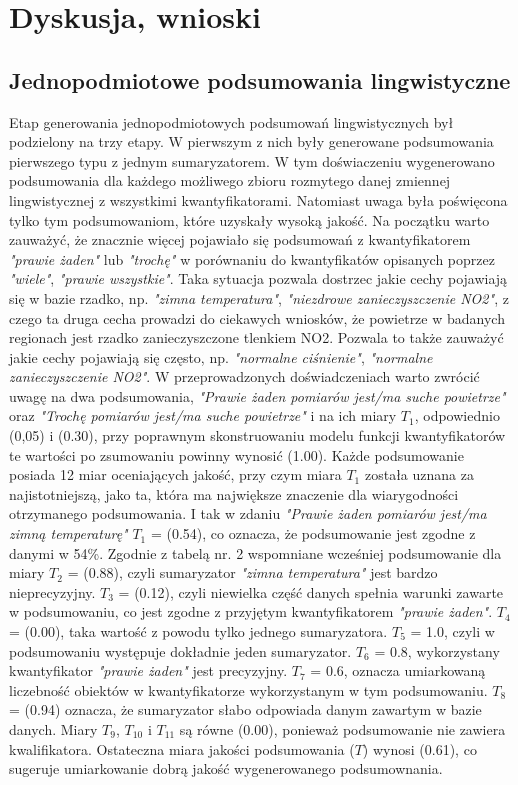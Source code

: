 \documentclass{article}
\begin{document}
\section{Dyskusja, wnioski}

\subsection{Jednopodmiotowe podsumowania lingwistyczne}
Etap generowania jednopodmiotowych podsumowań lingwistycznych był podzielony na trzy etapy. W pierwszym z nich były generowane podsumowania pierwszego typu z jednym sumaryzatorem. W tym doświaczeniu wygenerowano podsumowania dla każdego możliwego zbioru rozmytego danej zmiennej lingwistycznej z wszystkimi kwantyfikatorami. Natomiast uwaga była poświęcona tylko tym podsumowaniom, które uzyskały wysoką jakość. Na początku warto zauważyć, że znacznie więcej pojawiało się podsumowań z kwantyfikatorem \textit{"prawie żaden"} lub \textit{"trochę"} w porównaniu do kwantyfikatów opisanych poprzez \textit{"wiele"}, \textit{"prawie wszystkie"}. Taka sytuacja pozwala dostrzec jakie cechy pojawiają się w bazie rzadko, np. \textit{"zimna temperatura"}, \textit{"niezdrowe zanieczyszczenie NO2"}, z czego ta druga cecha prowadzi do ciekawych wniosków, że powietrze w badanych regionach jest rzadko zanieczyszczone tlenkiem NO2. Pozwala to także zauważyć jakie cechy pojawiają się często, np. \textit{"normalne ciśnienie"}, \textit{"normalne zanieczyszczenie NO2"}. W przeprowadzonych doświadczeniach warto zwrócić uwagę na dwa podsumowania, \textit{"Prawie żaden pomiarów jest/ma suche powietrze"} oraz \textit{"Trochę pomiarów jest/ma suche powietrze"} i na ich miary \(T_1\), odpowiednio (0,05) i (0.30), przy poprawnym skonstruowaniu modelu funkcji kwantyfikatorów te wartości po zsumowaniu powinny wynosić (1.00). Każde podsumowanie posiada 12 miar oceniających jakość, przy czym miara \(T_1\) została uznana za najistotniejszą, jako ta, która ma największe znaczenie dla wiarygodności otrzymanego podsumowania. I tak w zdaniu \textit{"Prawie żaden pomiarów jest/ma zimną temperaturę"} \(T_1\) = (0.54), co oznacza, że podsumowanie jest zgodne z danymi w 54\%. Zgodnie z tabelą nr. 2 wspomniane wcześniej podsumowanie dla miary \(T_2\) = (0.88), czyli sumaryzator \textit{"zimna temperatura"} jest bardzo nieprecyzyjny. \(T_3\) = (0.12), czyli niewielka część danych spełnia warunki zawarte w podsumowaniu, co jest zgodne z przyjętym kwantyfikatorem \textit{"prawie żaden"}. \(T_4\) = (0.00), taka wartość z powodu tylko jednego sumaryzatora. \(T_5\) = 1.0, czyli w podsumowaniu występuje dokładnie jeden sumaryzator. \(T_6\) = 0.8, wykorzystany kwantyfikator \textit{"prawie żaden"} jest precyzyjny. \(T_7\) = 0.6, oznacza umiarkowaną liczebność obiektów w kwantyfikatorze wykorzystanym w tym podsumowaniu. \(T_8\) = (0.94) oznacza, że sumaryzator słabo odpowiada danym zawartym w bazie danych. Miary \(T_9\), \(T_{10}\) i \(T_{11}\) są równe (0.00), ponieważ podsumowanie nie zawiera kwalifikatora. Ostateczna miara jakości podsumowania (\(T\)) wynosi (0{.}61), co sugeruje umiarkowanie dobrą jakość wygenerowanego podsumownania. \\
\end{document}

